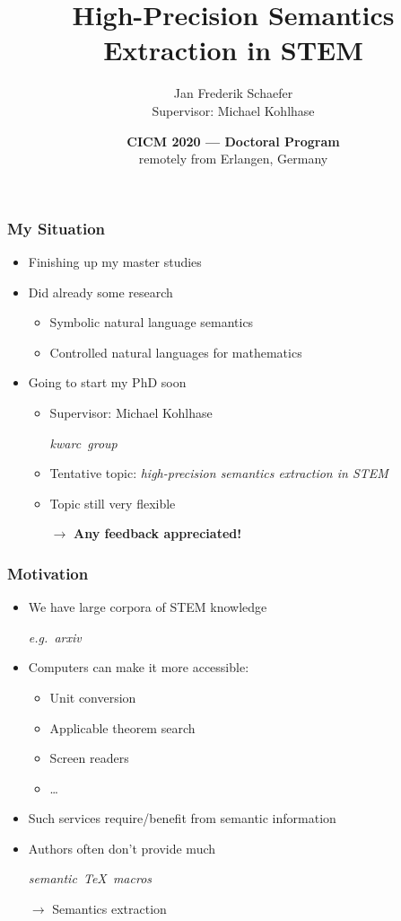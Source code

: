 \documentclass{beamer}
\title{High-Precision Semantics Extraction in STEM}
\author{Jan Frederik Schaefer \\ Supervisor: Michael Kohlhase}
\institute{FAU Erlangen-N\"urnberg}
\date{\textbf{CICM 2020 --- Doctoral Program} \\ remotely from Erlangen, Germany}
\newcommand{\com}[1]{\strut\hfil\strut\null\nobreak\hfill\hbox{{\itshape \color{black!50}#1}}\par}
\begin{document}
\begin{frame}
    \maketitle
\end{frame}

\begin{frame}
    \frametitle{My Situation}
    \begin{itemize}
        \item Finishing up my master studies
        \item Did already some research
            \begin{itemize}
                \item Symbolic natural language semantics
                \item Controlled natural languages for mathematics
            \end{itemize}
        \item Going to start my PhD soon
            \begin{itemize}
                \item Supervisor: Michael Kohlhase \com{kwarc group}
                \item Tentative topic: \emph{high-precision semantics extraction in STEM}
                \item Topic still very flexible
                \item[\boldmath$\rightarrow$] \textbf{Any feedback appreciated!}
            \end{itemize}
    \end{itemize}
\end{frame}

\begin{frame}
    \frametitle{Motivation}
    \begin{itemize}
        \item We have large corpora of STEM knowledge \com{e.g. arxiv}
        \item Computers can make it more accessible:
            \begin{itemize}
                \item Unit conversion
                \item Applicable theorem search
                \item Screen readers
                \item \dots
            \end{itemize}
        \item Such services require/benefit from semantic information
        \item Authors often don't provide much \com{semantic \TeX{} macros}
        \item[\boldmath$\rightarrow$] Semantics extraction
    \end{itemize}
\end{frame}
\end{document}
